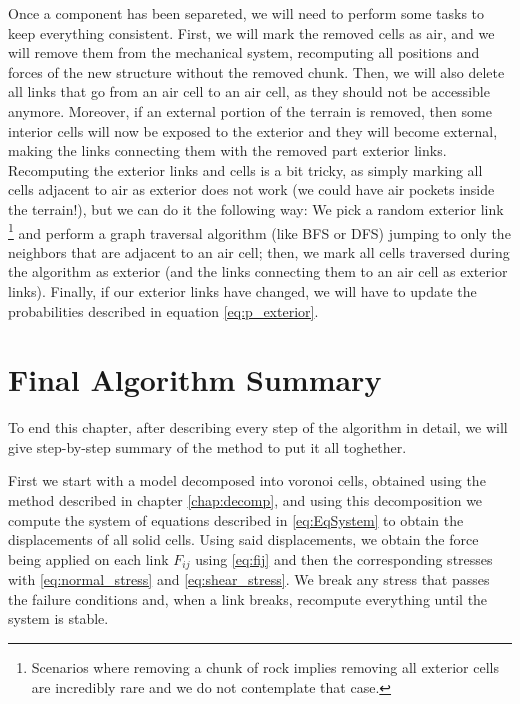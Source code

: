 Once a component has been separeted, we will need to perform some tasks
to keep everything consistent. First, we will mark the removed 
cells as air, and we will remove them from the mechanical system, recomputing 
all positions and forces of the new structure without the removed chunk. Then, 
we will also delete all links that go from an air cell to an air cell, as 
they should not be accessible anymore. Moreover, if an external portion 
of the terrain is removed, then some interior cells will now be exposed 
to the exterior and they will become external, making the links connecting them 
with the removed part exterior links. Recomputing the exterior
links and cells is a bit tricky, as simply marking all cells 
adjacent to air as exterior does not work (we could have air pockets 
inside the terrain!), but we can do it the following way: We pick a random 
exterior link \footnote{Scenarios where removing a chunk of rock implies 
removing all exterior cells are incredibly rare and we do not contemplate 
that case.} and perform a graph traversal algorithm (like BFS or DFS) jumping 
to only the neighbors that are adjacent to an air cell; then, we mark all 
cells traversed during the algorithm as exterior (and the links connecting 
them to an air cell as exterior links). Finally, if our 
exterior links have changed, we will have to update the probabilities 
described in equation \ref{eq:p_exterior}.
 

\section{Final Algorithm Summary}\label{sec:finalAlgo}

To end this chapter, after describing every step of the algorithm 
in detail, we will give step-by-step summary of the method to put it 
all toghether.

\vspace{10pt}

First we start with a model decomposed into voronoi cells, obtained 
using the method described in chapter \ref{chap:decomp}, and using 
this decomposition we compute the system of equations 
described in \ref{eq:EqSystem} to obtain the displacements of all 
solid cells. Using said displacements, we obtain the force 
being applied on each link $F_{ij}$ using \ref{eq:fij} and then 
the corresponding stresses with \ref{eq:normal_stress} and \ref{eq:shear_stress}.
We break any stress that passes the failure conditions and, when a link breaks, recompute 
everything until the system is stable. 

